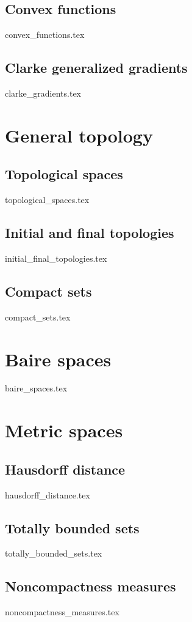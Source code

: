 \documentclass[numbers=endperiod, bibliography=totocnumbered]{scrartcl}
\begin{document}
\subsection{Convex functions}\label{sec:convex_functions}
{convex_functions.tex}
\subsection{Clarke generalized gradients}\label{sec:clarke_gradients}
{clarke_gradients.tex}

\section{General topology}\label{sec:general_topology}
\subsection{Topological spaces}\label{sec:topological_spaces}
{topological_spaces.tex}
\subsection{Initial and final topologies}\label{sec:initial_final_topologies}
{initial_final_topologies.tex}
\subsection{Compact sets}\label{sec:compact_sets}
{compact_sets.tex}
\section{Baire spaces}\label{sec:baire_spaces}
{baire_spaces.tex}

\section{Metric spaces}\label{sec:metric_spaces}
\subsection{Hausdorff distance}\label{sec:hausdorff_distance}
{hausdorff_distance.tex}
\subsection{Totally bounded sets}\label{sec:totally_bounded_sets}
{totally_bounded_sets.tex}
\subsection{Noncompactness measures}\label{sec:noncompactness_measures}
{noncompactness_measures.tex}
\end{document}
